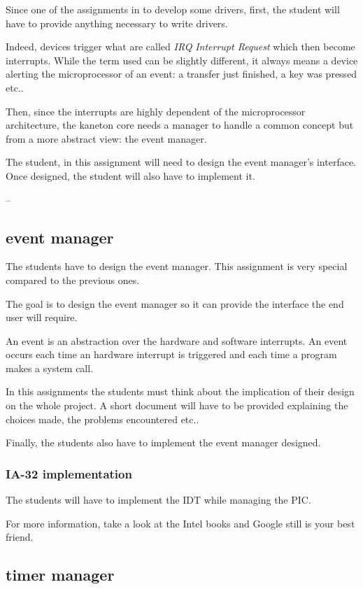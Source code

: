 Since one of the assignments in to develop some drivers, first,
the student will have to provide anything necessary to write drivers.

Indeed, devices trigger what are called \textit{IRQ}
\textit{Interrupt Request} which then become interrupts. While the term
used can be slightly different, it always means a device alerting the
microprocessor of an event: a transfer just finished, a key was pressed
etc..

Then, since the interrupts are highly dependent of the microprocessor
architecture, the kaneton core needs a manager to handle a common
concept but from a more abstract view: the event manager.

The student, in this assignment will need to design the event manager's
interface. Once designed, the student will also have to implement it.


--

\subsection{event manager}

The students have to design the event manager. This assignment is very
special compared to the previous ones.

The goal is to design the event manager so it can provide the
interface the end user will require.

An event is an abstraction over the hardware and software interrupts.
An event occurs each time an hardware interrupt is triggered and each
time a program makes a system call.

In this assignments the students must think about the implication of
their design on the whole project. A short document will have to be
provided explaining the choices made, the problems encountered etc..

Finally, the students also have to implement the event manager designed.

\subsubsection{IA-32 implementation}

The students will have to implement the IDT while managing the PIC.

For more information, take a look at the Intel books and Google still
is your best friend.

\subsection{timer manager}


